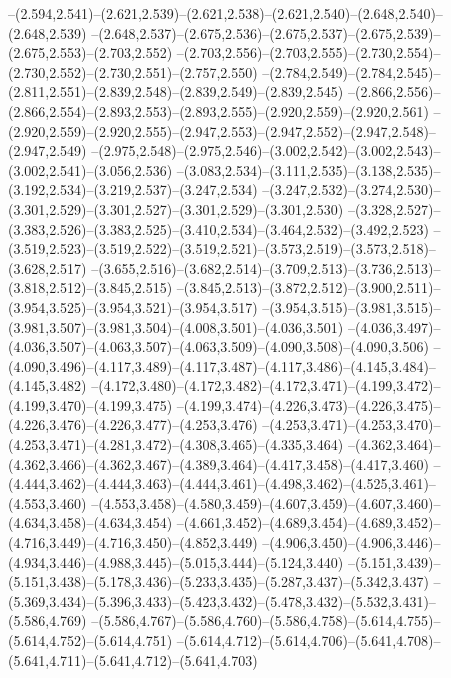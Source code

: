   --(2.594,2.541)--(2.621,2.539)--(2.621,2.538)--(2.621,2.540)--(2.648,2.540)--(2.648,2.539)%
  --(2.648,2.537)--(2.675,2.536)--(2.675,2.537)--(2.675,2.539)--(2.675,2.553)--(2.703,2.552)%
  --(2.703,2.556)--(2.703,2.555)--(2.730,2.554)--(2.730,2.552)--(2.730,2.551)--(2.757,2.550)%
  --(2.784,2.549)--(2.784,2.545)--(2.811,2.551)--(2.839,2.548)--(2.839,2.549)--(2.839,2.545)%
  --(2.866,2.556)--(2.866,2.554)--(2.893,2.553)--(2.893,2.555)--(2.920,2.559)--(2.920,2.561)%
  --(2.920,2.559)--(2.920,2.555)--(2.947,2.553)--(2.947,2.552)--(2.947,2.548)--(2.947,2.549)%
  --(2.975,2.548)--(2.975,2.546)--(3.002,2.542)--(3.002,2.543)--(3.002,2.541)--(3.056,2.536)%
  --(3.083,2.534)--(3.111,2.535)--(3.138,2.535)--(3.192,2.534)--(3.219,2.537)--(3.247,2.534)%
  --(3.247,2.532)--(3.274,2.530)--(3.301,2.529)--(3.301,2.527)--(3.301,2.529)--(3.301,2.530)%
  --(3.328,2.527)--(3.383,2.526)--(3.383,2.525)--(3.410,2.534)--(3.464,2.532)--(3.492,2.523)%
  --(3.519,2.523)--(3.519,2.522)--(3.519,2.521)--(3.573,2.519)--(3.573,2.518)--(3.628,2.517)%
  --(3.655,2.516)--(3.682,2.514)--(3.709,2.513)--(3.736,2.513)--(3.818,2.512)--(3.845,2.515)%
  --(3.845,2.513)--(3.872,2.512)--(3.900,2.511)--(3.954,3.525)--(3.954,3.521)--(3.954,3.517)%
  --(3.954,3.515)--(3.981,3.515)--(3.981,3.507)--(3.981,3.504)--(4.008,3.501)--(4.036,3.501)%
  --(4.036,3.497)--(4.036,3.507)--(4.063,3.507)--(4.063,3.509)--(4.090,3.508)--(4.090,3.506)%
  --(4.090,3.496)--(4.117,3.489)--(4.117,3.487)--(4.117,3.486)--(4.145,3.484)--(4.145,3.482)%
  --(4.172,3.480)--(4.172,3.482)--(4.172,3.471)--(4.199,3.472)--(4.199,3.470)--(4.199,3.475)%
  --(4.199,3.474)--(4.226,3.473)--(4.226,3.475)--(4.226,3.476)--(4.226,3.477)--(4.253,3.476)%
  --(4.253,3.471)--(4.253,3.470)--(4.253,3.471)--(4.281,3.472)--(4.308,3.465)--(4.335,3.464)%
  --(4.362,3.464)--(4.362,3.466)--(4.362,3.467)--(4.389,3.464)--(4.417,3.458)--(4.417,3.460)%
  --(4.444,3.462)--(4.444,3.463)--(4.444,3.461)--(4.498,3.462)--(4.525,3.461)--(4.553,3.460)%
  --(4.553,3.458)--(4.580,3.459)--(4.607,3.459)--(4.607,3.460)--(4.634,3.458)--(4.634,3.454)%
  --(4.661,3.452)--(4.689,3.454)--(4.689,3.452)--(4.716,3.449)--(4.716,3.450)--(4.852,3.449)%
  --(4.906,3.450)--(4.906,3.446)--(4.934,3.446)--(4.988,3.445)--(5.015,3.444)--(5.124,3.440)%
  --(5.151,3.439)--(5.151,3.438)--(5.178,3.436)--(5.233,3.435)--(5.287,3.437)--(5.342,3.437)%
  --(5.369,3.434)--(5.396,3.433)--(5.423,3.432)--(5.478,3.432)--(5.532,3.431)--(5.586,4.769)%
  --(5.586,4.767)--(5.586,4.760)--(5.586,4.758)--(5.614,4.755)--(5.614,4.752)--(5.614,4.751)%
  --(5.614,4.712)--(5.614,4.706)--(5.641,4.708)--(5.641,4.711)--(5.641,4.712)--(5.641,4.703)%
